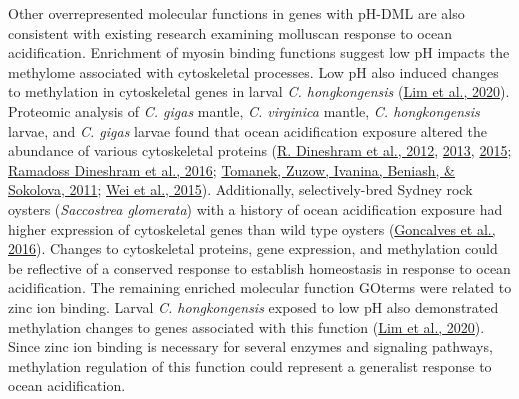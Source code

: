 \documentclass [11pt, proquest] {uwthesis}[2015/03/03]
\begin{document}
Other overrepresented molecular functions in genes with pH-DML are also consistent with existing research examining molluscan response to ocean acidification. Enrichment of myosin binding functions suggest low pH impacts the methylome associated with cytoskeletal processes. Low pH also induced changes to methylation in cytoskeletal genes in larval \emph{C. hongkongensis} (\protect\hyperlink{ref-Lim2020}{Lim et al., 2020}). Proteomic analysis of \emph{C. gigas} mantle, \emph{C. virginica} mantle, \emph{C. hongkongensis} larvae, and \emph{C. gigas} larvae found that ocean acidification exposure altered the abundance of various cytoskeletal proteins (\protect\hyperlink{ref-Dineshram2012}{R. Dineshram et al., 2012}, \protect\hyperlink{ref-Dineshram2013}{2013}, \protect\hyperlink{ref-Dineshram2015}{2015}; \protect\hyperlink{ref-Dineshram2016}{Ramadoss Dineshram et al., 2016}; \protect\hyperlink{ref-Tomanek2011}{Tomanek, Zuzow, Ivanina, Beniash, \& Sokolova, 2011}; \protect\hyperlink{ref-Wei2015}{Wei et al., 2015}). Additionally, selectively-bred Sydney rock oysters (\emph{Saccostrea glomerata}) with a history of ocean acidification exposure had higher expression of cytoskeletal genes than wild type oysters (\protect\hyperlink{ref-Goncalves2016}{Goncalves et al., 2016}). Changes to cytoskeletal proteins, gene expression, and methylation could be reflective of a conserved response to establish homeostasis in response to ocean acidification. The remaining enriched molecular function GOterms were related to zinc ion binding. Larval \emph{C. hongkongensis} exposed to low pH also demonstrated methylation changes to genes associated with this function (\protect\hyperlink{ref-Lim2020}{Lim et al., 2020}). Since zinc ion binding is necessary for several enzymes and signaling pathways, methylation regulation of this function could represent a generalist response to ocean acidification.
\end{document}
